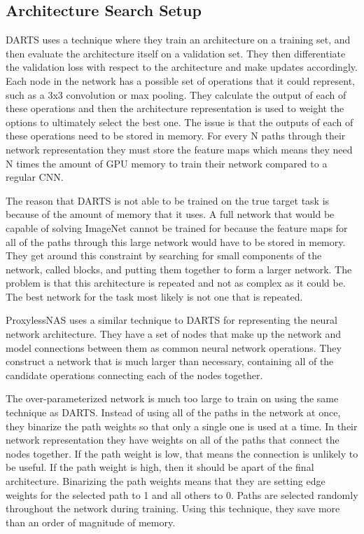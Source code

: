 \documentclass{ieee}
\begin{document}
\subsection{Architecture Search Setup}
DARTS uses a technique where they train an architecture on a training set, and then evaluate the architecture itself on a validation set. They then differentiate the validation loss with respect to the architecture and make updates accordingly. Each node in the network has a possible set of operations that it could represent, such as a 3x3 convolution or max pooling. They calculate the output of each of these operations and then the architecture representation is used to weight the options to ultimately select the best one. The issue is that the outputs of each of these operations need to be stored in memory. For every N paths through their network representation they must store the feature maps which means they need N times the amount of GPU memory to train their network compared to a regular CNN.

The reason that DARTS is not able to be trained on the true target task is because of the amount of memory that it uses. A full network that would be capable of solving ImageNet cannot be trained for because the feature maps for all of the paths through this large network would have to be stored in memory. They get around this constraint by searching for small components of the network, called blocks, and putting them together to form a larger network. The problem is that this architecture is repeated and not as complex as it could be. The best network for the task most likely is not one that is repeated.

ProxylessNAS uses a similar technique to DARTS for representing the neural network architecture. They have a set of nodes that make up the network and model connections between them as common neural network operations. They construct a network that is much larger than necessary, containing all of the candidate operations connecting each of the nodes together.

The over-parameterized network is much too large to train on using the same technique as DARTS. Instead of using all of the paths in the network at once, they binarize the path weights so that only a single one is used at a time. In their network representation they have weights on all of the paths that connect the nodes together. If the path weight is low, that means the connection is unlikely to be useful. If the path weight is high, then it should be apart of the final architecture. Binarizing the path weights means that they are setting edge weights for the selected path to 1 and all others to 0. Paths are selected randomly throughout the network during training. Using this technique, they save more than an order of magnitude of memory.
\end{document}
